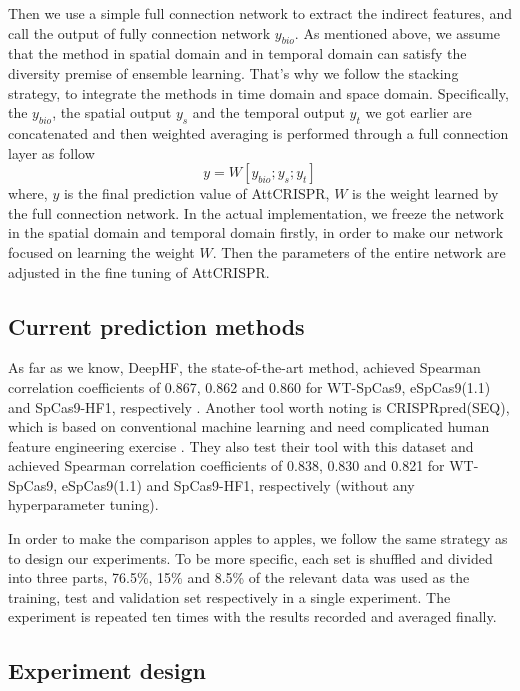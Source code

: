 \documentclass{bioinfo}
\begin{document}
Then we use a simple full connection network to extract the indirect features, and call the output of fully connection network $y_{bio}$. 
As mentioned above, we assume that the method in spatial domain and in temporal domain can satisfy the diversity premise of ensemble learning.
That's why we follow the stacking strategy, to integrate the methods in time domain and space domain. 
Specifically, the $y_{bio}$, the spatial output $y_{s}$ and the temporal output $y_{t}$ we got earlier are concatenated and then weighted averaging is performed through a full connection layer as follow
\begin{equation}
y=W[y_{bio};y_s;y_t]\label{eq:20}
\end{equation}
where, $y$ is the final prediction value of AttCRISPR, $W$ is the weight learned by the full connection network. 
In the actual implementation, we freeze the network in the spatial domain and temporal domain firstly, in order to make our network focused on learning the weight $W$.
Then the parameters of the entire network are adjusted in the fine tuning of AttCRISPR.

\subsection{Current prediction methods}

As far as we know, DeepHF, the state-of-the-art method, 
achieved Spearman correlation coefficients of 0.867, 0.862 and 0.860 for WT-SpCas9, eSpCas9(1.1) and SpCas9-HF1, respectively \citep{wang2019optimized}. 
Another tool worth noting is CRISPRpred(SEQ), which is based on conventional machine learning and need complicated human feature engineering exercise \citep{MuhammadRafid2020}. 
They also test their tool with this dataset and achieved Spearman correlation coefficients of 0.838, 0.830 and 0.821 for WT-SpCas9, eSpCas9(1.1) and SpCas9-HF1, respectively (without any hyperparameter tuning).

In order to make the comparison apples to apples, we follow the same strategy as \citeauthor{wang2019optimized} to design our experiments.
To be more specific, each set is shuffled and divided into three parts, 76.5\%, 15\% and 8.5\% of the relevant data was used as the training, test and validation set respectively in a single experiment. 
The experiment is repeated ten times with the results recorded and averaged finally.

\subsection{Experiment design}
\end{document}
